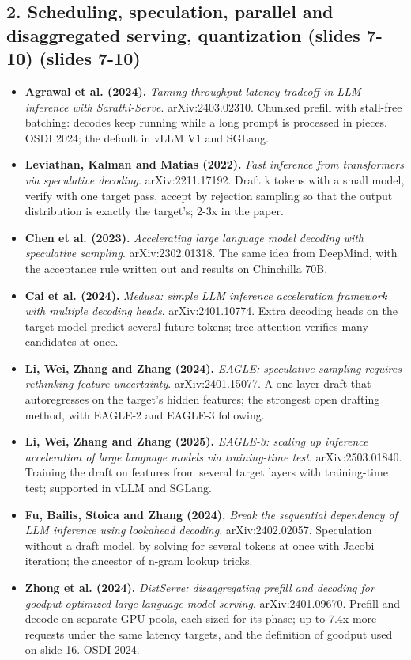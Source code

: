 \documentclass[11pt,letterpaper]{article}
\begin{document}
\subsection*{2. Scheduling, speculation, parallel and disaggregated serving, quantization (slides 7-10) (slides 7-10)}
\begin{itemize}[leftmargin=1.2em,itemsep=3pt]\sloppy
\item \textbf{Agrawal et al. (2024).} \textit{Taming throughput-latency tradeoff in LLM inference with Sarathi-Serve}. arXiv:2403.02310. Chunked prefill with stall-free batching: decodes keep running while a long prompt is processed in pieces. OSDI 2024; the default in vLLM V1 and SGLang.
\item \textbf{Leviathan, Kalman and Matias (2022).} \textit{Fast inference from transformers via speculative decoding}. arXiv:2211.17192. Draft k tokens with a small model, verify with one target pass, accept by rejection sampling so that the output distribution is exactly the target's; 2-3x in the paper.
\item \textbf{Chen et al. (2023).} \textit{Accelerating large language model decoding with speculative sampling}. arXiv:2302.01318. The same idea from DeepMind, with the acceptance rule written out and results on Chinchilla 70B.
\item \textbf{Cai et al. (2024).} \textit{Medusa: simple LLM inference acceleration framework with multiple decoding heads}. arXiv:2401.10774. Extra decoding heads on the target model predict several future tokens; tree attention verifies many candidates at once.
\item \textbf{Li, Wei, Zhang and Zhang (2024).} \textit{EAGLE: speculative sampling requires rethinking feature uncertainty}. arXiv:2401.15077. A one-layer draft that autoregresses on the target's hidden features; the strongest open drafting method, with EAGLE-2 and EAGLE-3 following.
\item \textbf{Li, Wei, Zhang and Zhang (2025).} \textit{EAGLE-3: scaling up inference acceleration of large language models via training-time test}. arXiv:2503.01840. Training the draft on features from several target layers with training-time test; supported in vLLM and SGLang.
\item \textbf{Fu, Bailis, Stoica and Zhang (2024).} \textit{Break the sequential dependency of LLM inference using lookahead decoding}. arXiv:2402.02057. Speculation without a draft model, by solving for several tokens at once with Jacobi iteration; the ancestor of n-gram lookup tricks.
\item \textbf{Zhong et al. (2024).} \textit{DistServe: disaggregating prefill and decoding for goodput-optimized large language model serving}. arXiv:2401.09670. Prefill and decode on separate GPU pools, each sized for its phase; up to 7.4x more requests under the same latency targets, and the definition of goodput used on slide 16. OSDI 2024.

\end{itemize}
\end{document}

